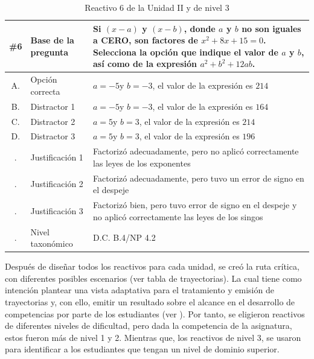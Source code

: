 \documentclass[spanish]{textolivre}
\begin{document}
\begin{table}[h!]
\caption{Reactivo 6 de la Unidad II y de nivel 3} %
\centering %
\begin{tabular} { c p{4cm} p{9cm} } %
\hline %
\#6 & Base de la pregunta & Si $(x-a)$ y $(x-b)$, donde $a$ y $b$ no son iguales a CERO, son factores de $x^2+8x+15=0$. Selecciona la opción que indique el valor de $a$ y $b$, así como de la expresión $a^2+b^2+12ab$. \\ [0.4ex] %
\hline %
A.  & Opción correcta &$a=-5$y $b=-3$, el valor de la expresión es $214$\\
B.  & Distractor 1 &$a=-5$y $b=-3$, el valor de la expresión es $164$ \\
C. & Distractor 2  &$a=5$y $b=3$, el valor de la expresión es $214$ \\
D. & Distractor 3  &$a=5$y $b=3$, el valor de la expresión es $196$ \\
. & Justificación 1 & Factorizó adecuadamente, pero no aplicó correctamente las leyes de los exponentes\\
. & Justificación 2 & Factorizó adecuadamente, pero tuvo un error de signo en el despeje\\
. & Justificación 3 & Factorizó bien, pero tuvo error de signo en el despeje y no aplicó correctamente las leyes de los singos\\
. & Nivel taxonómico & D.C. B.4/NP 4.2\\
\hline
\end{tabular}
\label{tbl04} %
\end{table}

Después de diseñar todos los reactivos para cada unidad, se creó la ruta crítica, con diferentes posibles escenarios (ver tabla de trayectorias). La cual tiene como intención plantear una vista adaptativa para el tratamiento y emisión de trayectorias y, con ello, emitir un resultado sobre el alcance en el desarrollo de competencias por parte de los estudiantes (ver ). Por tanto, se eligieron reactivos de diferentes niveles de dificultad, pero dada la competencia de la asignatura, estos fueron más de nivel 1 y 2. Mientras que, los reactivos de nivel 3, se usaron para identificar a los estudiantes que tengan un nivel de dominio superior.
\end{document}
